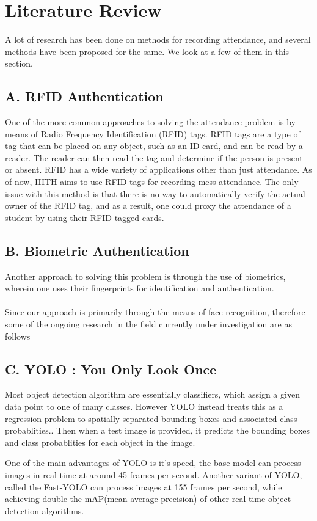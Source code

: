 \documentclass[conference]{IEEEtran}
\begin{document}
\section{Literature Review}
A lot of research has been done on methods for recording attendance, and several methods have been proposed for the same. We look at a few of them in this section.
\subsection*{A. RFID Authentication}
One of the more common approaches to solving the attendance problem is by means of Radio Frequency Identification (RFID) tags. RFID tags are a type of tag that can be placed on any object, such as an ID-card, and can be read by a reader. The reader can then read the tag and determine if the person is present or absent.
RFID has a wide variety of applications other than just attendance. As of now, IIITH aims to use RFID tags for recording mess attendance. The only issue with this method is that there is no way to automatically verify the actual owner of the RFID tag, and as a result, one could proxy the attendance of a student by using their RFID-tagged cards.
\subsection*{B. Biometric Authentication}
Another approach to solving this problem is through the use of biometrics, wherein one uses their fingerprints for identification and authentication. \\ \\
Since our approach is primarily through the means of face recognition, therefore some of the ongoing research in the field currently under investigation are as follows 

\subsection*{C. YOLO : You Only Look Once}
Most object detection algorithm are essentially classifiers, which assign a given data point to one of many classes. 
However YOLO instead treats this as a regression problem to spatially separated bounding boxes and associated class probablities.. Then when a test image is provided, it predicts the bounding boxes and class probablities for each object in the image.
\par 
One of the main advantages of YOLO is it's speed, the base model can process images in real-time at around 45 frames per second. Another variant of YOLO, called the Fast-YOLO can process images at 155 frames per second, while achieving double the mAP(mean average precision) of other real-time object detection algorithms.
\end{document}
